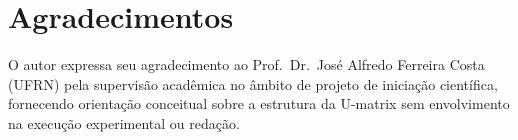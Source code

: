 \documentclass[10pt,journal,compsoc,twocolumn]{IEEEtran}
\begin{document}
\section*{Agradecimentos}
O autor expressa seu agradecimento ao Prof.\ Dr.\ Jos\'e Alfredo Ferreira Costa
(UFRN) pela supervis\~ao acad\^emica no \^ambito de projeto de inicia\c{c}\~ao
cient\'ifica, fornecendo orienta\c{c}\~ao conceitual sobre a estrutura da U-matrix
sem envolvimento na execu\c{c}\~ao experimental ou reda\c{c}\~ao.



\end{document}
